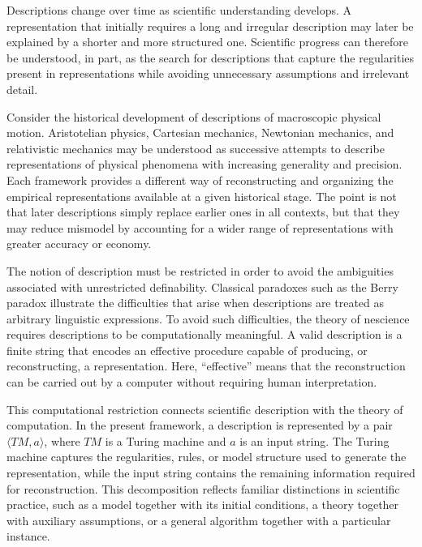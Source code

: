 Descriptions change over time as scientific understanding develops. A representation that initially requires a long and irregular description may later be explained by a shorter and more structured one. Scientific progress can therefore be understood, in part, as the search for descriptions that capture the regularities present in representations while avoiding unnecessary assumptions and irrelevant detail.

\begin{example}
Consider the historical development of descriptions of macroscopic physical motion. Aristotelian physics, Cartesian mechanics, Newtonian mechanics, and relativistic mechanics may be understood as successive attempts to describe representations of physical phenomena with increasing generality and precision. Each framework provides a different way of reconstructing and organizing the empirical representations available at a given historical stage. The point is not that later descriptions simply replace earlier ones in all contexts, but that they may reduce mismodel by accounting for a wider range of representations with greater accuracy or economy.
\end{example}

The notion of description must be restricted in order to avoid the ambiguities associated with unrestricted definability. Classical paradoxes such as the Berry paradox illustrate the difficulties that arise when descriptions are treated as arbitrary linguistic expressions. To avoid such difficulties, the theory of nescience requires descriptions to be computationally meaningful. A valid description is a finite string that encodes an effective procedure capable of producing, or reconstructing, a representation. Here, ``effective'' means that the reconstruction can be carried out by a computer without requiring human interpretation.

This computational restriction connects scientific description with the theory of computation. In the present framework, a description is represented by a pair $\langle TM,a\rangle$, where $TM$ is a Turing machine and $a$ is an input string. The Turing machine captures the regularities, rules, or model structure used to generate the representation, while the input string contains the remaining information required for reconstruction. This decomposition reflects familiar distinctions in scientific practice, such as a model together with its initial conditions, a theory together with auxiliary assumptions, or a general algorithm together with a particular instance.


